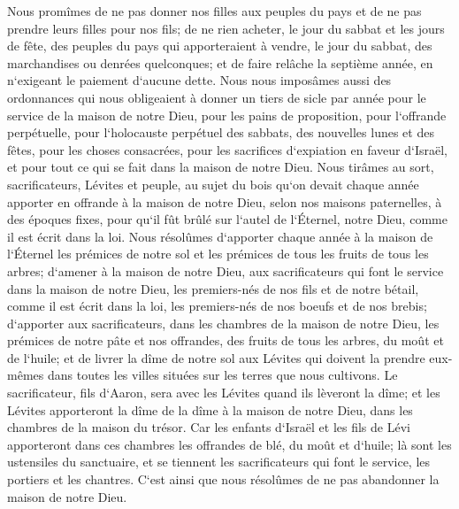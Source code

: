 \verse Nous promîmes de ne pas donner nos filles aux peuples du pays et de ne pas prendre leurs filles pour nos fils; 
\verse de ne rien acheter, le jour du sabbat et les jours de fête, des peuples du pays qui apporteraient à vendre, le jour du sabbat, des marchandises ou denrées quelconques; et de faire relâche la septième année, en n`exigeant le paiement d`aucune dette. 
\verse Nous nous imposâmes aussi des ordonnances qui nous obligeaient à donner un tiers de sicle par année pour le service de la maison de notre Dieu, 
\verse pour les pains de proposition, pour l`offrande perpétuelle, pour l`holocauste perpétuel des sabbats, des nouvelles lunes et des fêtes, pour les choses consacrées, pour les sacrifices d`expiation en faveur d`Israël, et pour tout ce qui se fait dans la maison de notre Dieu. 
\verse Nous tirâmes au sort, sacrificateurs, Lévites et peuple, au sujet du bois qu`on devait chaque année apporter en offrande à la maison de notre Dieu, selon nos maisons paternelles, à des époques fixes, pour qu`il fût brûlé sur l`autel de l`Éternel, notre Dieu, comme il est écrit dans la loi. 
\verse Nous résolûmes d`apporter chaque année à la maison de l`Éternel les prémices de notre sol et les prémices de tous les fruits de tous les arbres; 
\verse d`amener à la maison de notre Dieu, aux sacrificateurs qui font le service dans la maison de notre Dieu, les premiers-nés de nos fils et de notre bétail, comme il est écrit dans la loi, les premiers-nés de nos boeufs et de nos brebis; 
\verse d`apporter aux sacrificateurs, dans les chambres de la maison de notre Dieu, les prémices de notre pâte et nos offrandes, des fruits de tous les arbres, du moût et de l`huile; et de livrer la dîme de notre sol aux Lévites qui doivent la prendre eux-mêmes dans toutes les villes situées sur les terres que nous cultivons. 
\verse Le sacrificateur, fils d`Aaron, sera avec les Lévites quand ils lèveront la dîme; et les Lévites apporteront la dîme de la dîme à la maison de notre Dieu, dans les chambres de la maison du trésor. 
\verse Car les enfants d`Israël et les fils de Lévi apporteront dans ces chambres les offrandes de blé, du moût et d`huile; là sont les ustensiles du sanctuaire, et se tiennent les sacrificateurs qui font le service, les portiers et les chantres. C`est ainsi que nous résolûmes de ne pas abandonner la maison de notre Dieu. 

